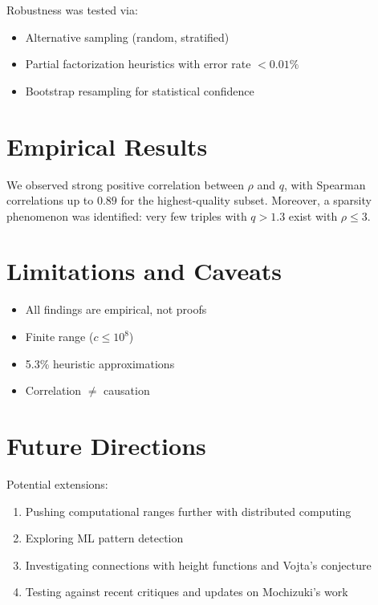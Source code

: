 \documentclass[11pt,a4paper]{article}
\begin{document}
Robustness was tested via:
\begin{itemize}
    \item Alternative sampling (random, stratified)
    \item Partial factorization heuristics with error rate $<0.01\%$
    \item Bootstrap resampling for statistical confidence
\end{itemize}

\section{Empirical Results}

We observed strong positive correlation between $\rho$ and $q$, with Spearman correlations up to $0.89$ for the highest-quality subset. Moreover, a sparsity phenomenon was identified: very few triples with $q > 1.3$ exist with $\rho \leq 3$.

\section{Limitations and Caveats}

\begin{itemize}
    \item All findings are empirical, not proofs
    \item Finite range ($c \leq 10^8$)
    \item 5.3\% heuristic approximations
    \item Correlation $\neq$ causation
\end{itemize}

\section{Future Directions}

Potential extensions:
\begin{enumerate}
    \item Pushing computational ranges further with distributed computing
    \item Exploring ML pattern detection \citep{allen2021abcml}
    \item Investigating connections with height functions and Vojta’s conjecture \citep{vojta1999abc}
    \item Testing against recent critiques and updates on Mochizuki’s work \citep{joshi2025abcupdate}
\end{enumerate}
\end{document}
